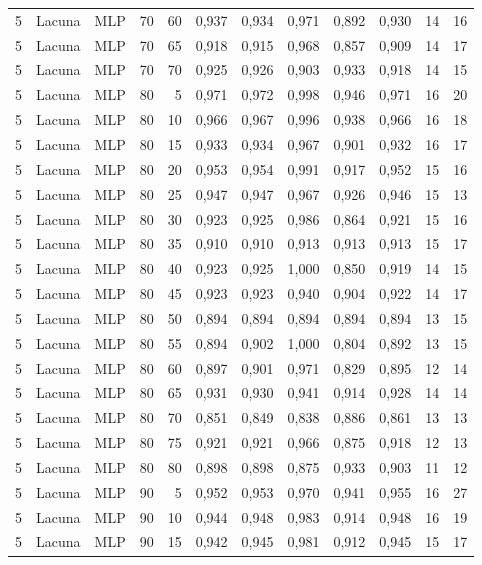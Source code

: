 \begin{longtable}{ccclrrrrrrrr}
5 & Lacuna & MLP & 70 & 60 & 0,937 & 0,934 & 0,971 & 0,892 & 0,930 & 14 & 16 \\
5 & Lacuna & MLP & 70 & 65 & 0,918 & 0,915 & 0,968 & 0,857 & 0,909 & 14 & 17 \\
5 & Lacuna & MLP & 70 & 70 & 0,925 & 0,926 & 0,903 & 0,933 & 0,918 & 14 & 15 \\
5 & Lacuna & MLP & 80 & 5 & 0,971 & 0,972 & 0,998 & 0,946 & 0,971 & 16 & 20 \\
5 & Lacuna & MLP & 80 & 10 & 0,966 & 0,967 & 0,996 & 0,938 & 0,966 & 16 & 18 \\
5 & Lacuna & MLP & 80 & 15 & 0,933 & 0,934 & 0,967 & 0,901 & 0,932 & 16 & 17 \\
5 & Lacuna & MLP & 80 & 20 & 0,953 & 0,954 & 0,991 & 0,917 & 0,952 & 15 & 16 \\
5 & Lacuna & MLP & 80 & 25 & 0,947 & 0,947 & 0,967 & 0,926 & 0,946 & 15 & 13 \\
5 & Lacuna & MLP & 80 & 30 & 0,923 & 0,925 & 0,986 & 0,864 & 0,921 & 15 & 16 \\
5 & Lacuna & MLP & 80 & 35 & 0,910 & 0,910 & 0,913 & 0,913 & 0,913 & 15 & 17 \\
5 & Lacuna & MLP & 80 & 40 & 0,923 & 0,925 & 1,000 & 0,850 & 0,919 & 14 & 15 \\
5 & Lacuna & MLP & 80 & 45 & 0,923 & 0,923 & 0,940 & 0,904 & 0,922 & 14 & 17 \\
5 & Lacuna & MLP & 80 & 50 & 0,894 & 0,894 & 0,894 & 0,894 & 0,894 & 13 & 15 \\
5 & Lacuna & MLP & 80 & 55 & 0,894 & 0,902 & 1,000 & 0,804 & 0,892 & 13 & 15 \\
5 & Lacuna & MLP & 80 & 60 & 0,897 & 0,901 & 0,971 & 0,829 & 0,895 & 12 & 14 \\
5 & Lacuna & MLP & 80 & 65 & 0,931 & 0,930 & 0,941 & 0,914 & 0,928 & 14 & 14 \\
5 & Lacuna & MLP & 80 & 70 & 0,851 & 0,849 & 0,838 & 0,886 & 0,861 & 13 & 13 \\
5 & Lacuna & MLP & 80 & 75 & 0,921 & 0,921 & 0,966 & 0,875 & 0,918 & 12 & 13 \\
5 & Lacuna & MLP & 80 & 80 & 0,898 & 0,898 & 0,875 & 0,933 & 0,903 & 11 & 12 \\
5 & Lacuna & MLP & 90 & 5 & 0,952 & 0,953 & 0,970 & 0,941 & 0,955 & 16 & 27 \\
5 & Lacuna & MLP & 90 & 10 & 0,944 & 0,948 & 0,983 & 0,914 & 0,948 & 16 & 19 \\
5 & Lacuna & MLP & 90 & 15 & 0,942 & 0,945 & 0,981 & 0,912 & 0,945 & 15 & 17 \\

\end{longtable}
